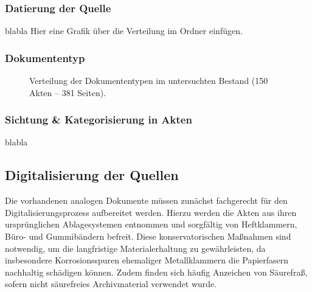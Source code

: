 \documentclass[12pt, a4paper, ngerman, bidi=default]{article}
\makeatletter
\let\oldparagraph\paragraph%
\renewcommand{\paragraph}{
    \@ifstar%
      \xxxParagraphStar%
      \xxxParagraphNoStar%
 }
\newcommand{\xxxParagraphStar}[1]{\oldparagraph*{#1}\mbox{}}
\newcommand{\xxxParagraphNoStar}[1]{\oldparagraph{#1}\mbox{}}
\makeatother
\begin{document}
\subsubsection{Datierung der Quelle}
blabla
Hier eine Grafik über die Verteilung im Ordner einfügen. 

\subsubsection{Dokumententyp}

\begin{figure}[htbp]
  \centering
  \caption{Verteilung der Dokumententypen im untersuchten Bestand (150 Akten – 381 Seiten).}\label{fig:dokumententypen-bar}
\end{figure}



\subsubsection{Sichtung \& Kategorisierung in Akten}
blabla

\subsection{Digitalisierung der Quellen}

Die vorhandenen analogen Dokumente müssen zunächst fachgerecht für den Digitalisierungsprozess aufbereitet werden. 
Hierzu werden die Akten aus ihren ursprünglichen Ablagesystemen entnommen und sorgfältig von Heftklammern, Büro- und Gummibändern 
befreit. Diese konservatorischen Maßnahmen sind notwendig, um die langfristige Materialerhaltung zu gewährleisten, 
da insbesondere Korrosionsspuren ehemaliger Metallklammern die Papierfasern nachhaltig schädigen können. Zudem finden sich häufig 
Anzeichen von Säurefraß, sofern nicht säurefreies Archivmaterial verwendet wurde.
\end{document}
